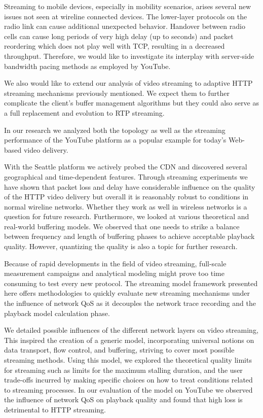 Streaming to mobile devices, especially in mobility scenarios, arises several new issues not seen at wireline connected devices. The lower-layer protocols on the radio link can cause additional unexpected behavior. Handover between radio cells can cause long periods of very high delay (up to seconds) and packet reordering which does not play well with TCP, resulting in a decreased throughput. Therefore, we would like to investigate its interplay with server-side bandwidth pacing methods as employed by YouTube.


We also would like to extend our analysis of video streaming to adaptive HTTP streaming mechanisms previously mentioned. We expect them to further complicate the client's buffer management algorithms but they could also serve as a full replacement and evolution to RTP streaming.


In our research we analyzed both the topology as well as the streaming performance of the YouTube platform as a popular example for today's Web-based video delivery. 

With the Seattle platform we actively probed the CDN and discovered several geographical and time-dependent features. Through streaming experiments we have shown that packet loss and delay have considerable influence on the quality of the HTTP video delivery but overall it is reasonably robust to conditions in normal wireline networks. Whether they work as well in wireless networks is a question for future research. Furthermore, we looked at various theoretical and real-world buffering models. We observed that one needs to strike a balance between frequency and length of buffering phases to achieve acceptable playback quality. However, quantizing the quality is also a topic for further research.





Because of rapid developments in the field of video streaming, full-scale measurement campaigns and analytical modeling might prove too time consuming to test every new protocol. The streaming model framework presented here offers methodologies to quickly evaluate new streaming mechanisms under the influence of network QoS as it decouples the network trace recording and the playback model calculation phase.

We detailed possible influences of the different network layers on video streaming, This inspired the creation of a generic model, incorporating universal notions on data transport, flow control, and buffering, striving to cover most possible streaming methods. Using this model, we explored the theoretical quality limits for streaming such as limits for the maximum stalling duration, and the user trade-offs incurred by making specific choices on how to treat conditions related to streaming processes. In our evaluation of the model on YouTube we observed the influence of network QoS on playback quality and found that high loss is detrimental to HTTP streaming.



